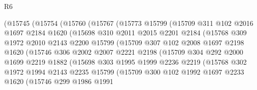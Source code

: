 \begin{lexlean}{R6}
\begin{coremodule}
            (@15745
              (@15754
                (@15760
                  (@15767
                    (@15773
                      @15799
                      (@15709
                        @311
                        @102
                        @2016
                        @1697
                        @2184
                        @1620
                        (@15698
                          @310
                          @2011
                          @2015
                          @2201
                          @2184
                          (@15768
                            @309
                            @1972
                            @2010
                            @2143
                            @2200
                            @15799
                            (@15709
                              @307
                              @102
                              @2008
                              @1697
                              @2198
                              @1620
                              (@15746
                                @306
                                @2002
                                @2007
                                @2221
                                @2198
                                (@15709
                                  @304
                                  @292
                                  @2000
                                  @1699
                                  @2219
                                  @1882
                                  (@15698
                                    @303
                                    @1995
                                    @1999
                                    @2236
                                    @2219
                                    (@15768
                                      @302
                                      @1972
                                      @1994
                                      @2143
                                      @2235
                                      @15799
                                      (@15709
                                        @300
                                        @102
                                        @1992
                                        @1697
                                        @2233
                                        @1620
                                        (@15746
                                          @299
                                          @1986
                                          @1991

\end{coremodule}
\end{lexlean}
